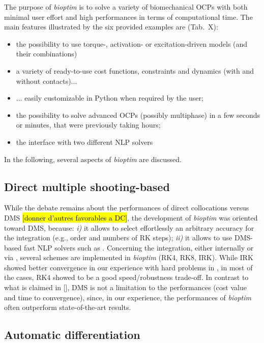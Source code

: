 The purpose of \textit{bioptim} is to solve a variety of biomechanical OCPs with both minimal user effort and high performances in terms of computational time. 
The main features illustrated by the six provided examples are (Tab.~X): 
\begin{itemize}
\item the possibility to use torque-, activation- or excitation-driven models (and their combinations)
\item a variety of ready-to-use cost functions, constraints and dynamics (with and without contacts)...
\item ... easily customizable in Python when required by the user;
\item the possibility to solve advanced OCPs (possibly multiphase) in a few seconds or minutes, that were previously taking hours;
\item the interface with two different NLP solvers
\end{itemize}
In the following, several aspects of \textit{bioptim} are discussed.


\subsection{Direct multiple shooting-based}

While the debate remains about the performances of direct collocations versus DMS \cite{diehl2006fast}\hl{[donner d'autres favorables a DC]}, the development of \textit{bioptim} was oriented toward DMS, because: \textit{i)} it allows to select effortlessly an arbitrary accuracy for the integration (e.g., order and numbers of RK steps); \textit{ii)} it allows to use DMS-based fast NLP solvers such as \acados.
Concerning the integration, either internally or via \acados, several schemes are implemented in \textit{bioptim} (RK4, RK8, IRK).
While IRK showed better convergence in our experience with hard problems in \acados, in most of the cases, RK4 showed to be a good speed/robustness trade-off. 
In contrast to what is claimed in [\addref], DMS is not a limitation to the performances (cost value and time to convergence), since, in our experience, the performances of \textit{bioptim} often outperform state-of-the-art results.

\subsection{Automatic differentiation}

